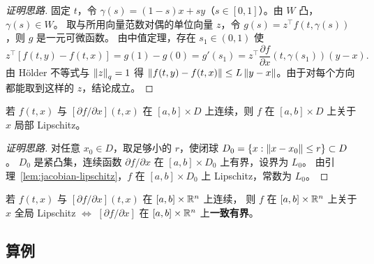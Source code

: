 \begin{proof}[证明思路]
固定 $t$，令 $\gamma(s)=(1-s)x+sy$（$s\in[0,1]$）。由 $W$ 凸，$\gamma(s)\in W$。
取与所用向量范数对偶的单位向量 $z$，令 $g(s)=z^\top f(t,\gamma(s))$，则 $g$ 是一元可微函数。
由中值定理，存在 $s_1\in(0,1)$ 使
\[
  z^\top[f(t,y)-f(t,x)] = g(1)-g(0)=g'(s_1)
  = z^\top\frac{\partial f}{\partial x}(t,\gamma(s_1))(y-x).
\]
由 Hölder 不等式与 $\left\lVert z\right\rVert_q=1$ 得
$\left\lVert f(t,y)-f(t,x)\right\rVert\le L\left\lVert y-x\right\rVert$。由于对每个方向都能取到这样的 $z$，结论成立。
\end{proof}

\begin{lemma}\label{lem:c1-locally-lipschitz}
  若 $f(t,x)$ 与 $[\partial f/\partial x](t,x)$ 在 $[a,b]\times D$ 上连续，则 $f$ 在 $[a,b]\times D$ 上关于 $x$ 局部 Lipschitz。
  \cite[Lemma 3.2]{khalilNonlinearSystems}
\end{lemma}

\begin{proof}[证明思路]
对任意 $x_0\in D$，取足够小的 $r$，使闭球 $D_0=\{x:\left\lVert x-x_0\right\rVert\le r\}\subset D$。
$D_0$ 是紧凸集，连续函数 $\partial f/\partial x$ 在 $[a,b]\times D_0$ 上有界，设界为 $L_0$。
由引理~\ref{lem:jacobian-lipschitz}，$f$ 在 $[a,b]\times D_0$ 上 Lipschitz，常数为 $L_0$。
\end{proof}

\begin{lemma}\label{lem:global-lipschitz-criterion}
  若 $f(t,x)$ 与 $[\partial f/\partial x](t,x)$ 在 $[a,b]\times\mathbb{R}^n$ 上连续，
  则 $f$ 在 $[a,b]\times\mathbb{R}^n$ 上关于 $x$ 全局 Lipschitz
  $\iff$ $[\partial f/\partial x]$ 在 $[a,b]\times\mathbb{R}^n$ 上\textbf{一致有界}。
  \cite[Lemma 3.3]{khalilNonlinearSystems}
\end{lemma}

\subsection{算例}


